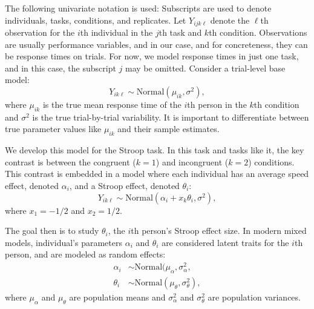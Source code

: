 \documentclass[english,man]{apa6}
\theoremstyle{definition}
\theoremstyle{definition}
\theoremstyle{remark}
\begin{document}
The following univariate notation is used: Subscripts are used to denote
individuals, tasks, conditions, and replicates. Let \(Y_{ijk\ell}\)
denote the \(\ell\)th observation for the \(i\)th individual in the
\(j\)th task and \(k\)th condition. Observations are usually performance
variables, and in our case, and for concreteness, they can be response
times on trials. For now, we model response times in just one task, and
in this case, the subscript \(j\) may be omitted. Consider a trial-level
base model: \[
Y_{ik\ell} \sim \mbox{Normal}(\mu_{ik},\sigma^2),
\] where \(\mu_{ik}\) is the true mean response time of the \(i\)th
person in the \(k\)th condition and \(\sigma^2\) is the true
trial-by-trial variability. It is important to differentiate between
true parameter values like \(\mu_{ik}\) and their sample estimates.

We develop this model for the Stroop task. In this task and tasks like
it, the key contrast is between the congruent (\(k=1\)) and incongruent
(\(k=2\)) conditions. This contrast is embedded in a model where each
individual has an average speed effect, denoted \(\alpha_i\), and a
Stroop effect, denoted \(\theta_i\): \[
Y_{ik\ell} \sim \mbox{Normal}(\alpha_{i}+x_k\theta_{i},\sigma^2),
\] where \(x_1=-1/2\) and \(x_2=1/2\).

The goal then is to study \(\theta_i\), the \(i\)th person's Stroop
effect size. In modern mixed models, individual's parameters
\(\alpha_i\) and \(\theta_i\) are considered latent traits for the
\(i\)th person, and are modeled as random effects: \[
\begin{aligned}
\alpha_i &\sim \mbox{Normal}(\mu_\alpha,\sigma^2_\alpha,\\
\theta_i &\sim \mbox{Normal}(\mu_\theta,\sigma^2_\theta),
\end{aligned}
\] where \(\mu_\alpha\) and \(\mu_\theta\) are population means and
\(\sigma^2_\alpha\) and \(\sigma^2_\theta\) are population variances.
\end{document}
